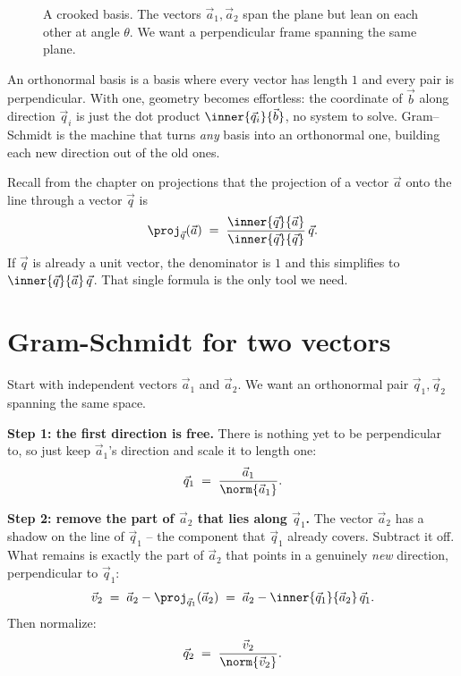 \begin{figure}[H]
\centering
{}
\caption{A crooked basis. The vectors $\vec{a}_1,\vec{a}_2$ span the plane but lean on
each other at angle $\theta$. We want a perpendicular frame spanning the same plane.}
\label{ch20:crooked}
\end{figure}

\begin{intuitionbox}
An orthonormal basis is a basis where every vector has length $1$ and every pair is
perpendicular. With one, geometry becomes effortless: the coordinate of $\vec{b}$
along direction $\vec{q}_i$ is just the dot product $\inner{\vec{q}_i}{\vec{b}}$, no
system to solve. Gram--Schmidt is the machine that turns \emph{any} basis into an
orthonormal one, building each new direction out of the old ones.
\end{intuitionbox}

Recall from the chapter on projections that the projection of a vector $\vec{a}$ onto
the line through a vector $\vec{q}$ is
\[
  \proj_{\vec{q}}(\vec{a}) \;=\; \frac{\inner{\vec{q}}{\vec{a}}}{\inner{\vec{q}}{\vec{q}}}\,\vec{q}.
\]
If $\vec{q}$ is already a unit vector, the denominator is $1$ and this simplifies to
$\inner{\vec{q}}{\vec{a}}\,\vec{q}$. That single formula is the only tool we need.

\section{Gram-Schmidt for two vectors}

Start with independent vectors $\vec{a}_1$ and $\vec{a}_2$. We want an orthonormal
pair $\vec{q}_1,\vec{q}_2$ spanning the same space.

\textbf{Step 1: the first direction is free.} There is nothing yet to be
perpendicular to, so just keep $\vec{a}_1$'s direction and scale it to length one:
\[
  \vec{q}_1 \;=\; \frac{\vec{a}_1}{\norm{\vec{a}_1}}.
\]

\textbf{Step 2: remove the part of $\vec{a}_2$ that lies along $\vec{q}_1$.}
The vector $\vec{a}_2$ has a shadow on the line of $\vec{q}_1$ -- the component that
$\vec{q}_1$ already covers. Subtract it off. What remains is exactly the part of
$\vec{a}_2$ that points in a genuinely \emph{new} direction, perpendicular to
$\vec{q}_1$:
\[
  \vec{v}_2 \;=\; \vec{a}_2 - \proj_{\vec{q}_1}(\vec{a}_2)
            \;=\; \vec{a}_2 - \inner{\vec{q}_1}{\vec{a}_2}\,\vec{q}_1.
\]
Then normalize:
\[
  \vec{q}_2 \;=\; \frac{\vec{v}_2}{\norm{\vec{v}_2}}.
\]

